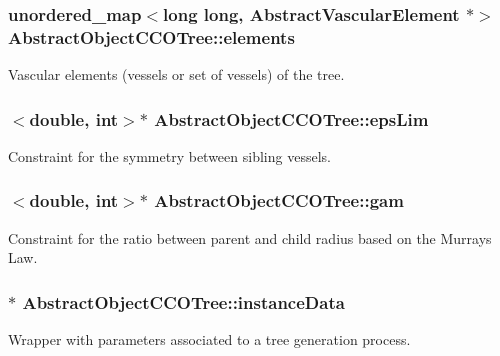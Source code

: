 \subsubsection[{\texorpdfstring{elements}{elements}}]{\setlength{\rightskip}{0pt plus 5cm}unordered\+\_\+map$<$long long, {\bf Abstract\+Vascular\+Element} $\ast$$>$ Abstract\+Object\+C\+C\+O\+Tree\+::elements\hspace{0.3cm}{\ttfamily [protected]}}\hypertarget{class_abstract_object_c_c_o_tree_a4635f6215b084867ee70135812c6971e}{}\label{class_abstract_object_c_c_o_tree_a4635f6215b084867ee70135812c6971e}
Vascular elements (vessels or set of vessels) of the tree. 
\subsubsection[{\texorpdfstring{eps\+Lim}{epsLim}}]{$<$double, int$>$$\ast$ Abstract\+Object\+C\+C\+O\+Tree\+::eps\+Lim\hspace{0.3cm}{\ttfamily [protected]}}\hypertarget{class_abstract_object_c_c_o_tree_a62d3e1ff7e74a6236422273f58fc6012}{}\label{class_abstract_object_c_c_o_tree_a62d3e1ff7e74a6236422273f58fc6012}
Constraint for the symmetry between sibling vessels. 
\subsubsection[{\texorpdfstring{gam}{gam}}]{$<$double, int$>$$\ast$ Abstract\+Object\+C\+C\+O\+Tree\+::gam\hspace{0.3cm}{\ttfamily [protected]}}\hypertarget{class_abstract_object_c_c_o_tree_aad315b93744637e18153c4434dac067d}{}\label{class_abstract_object_c_c_o_tree_aad315b93744637e18153c4434dac067d}
Constraint for the ratio between parent and child radius based on the Murray\textquotesingle{}s Law. 
\subsubsection[{\texorpdfstring{instance\+Data}{instanceData}}]{$\ast$ Abstract\+Object\+C\+C\+O\+Tree\+::instance\+Data\hspace{0.3cm}{\ttfamily [protected]}}\hypertarget{class_abstract_object_c_c_o_tree_aca7aecbd89dadc46dd9dce14cfde31e1}{}\label{class_abstract_object_c_c_o_tree_aca7aecbd89dadc46dd9dce14cfde31e1}
Wrapper with parameters associated to a tree generation process. 
